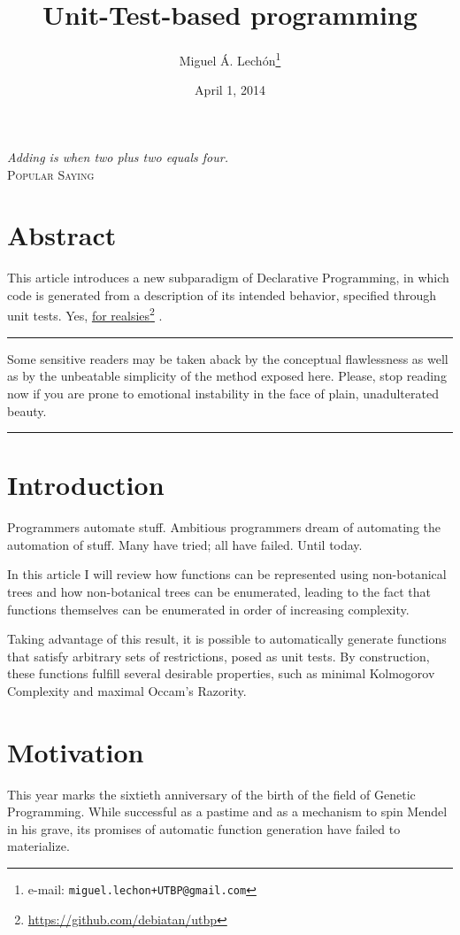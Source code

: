 \documentclass[12pt,twocolumn]{article}
\title{Unit-Test-based programming}
\author{
    Miguel Á. Lechón\footnote{{\small e-mail: \texttt{miguel.lechon+UTBP@gmail.com}}}
}
\date{April 1, 2014}
\newcommand\fnurl[2]{%
  \href{#1}{#2}\footnote{\url{#1}}%
}
\begin{document}
\maketitle
\thispagestyle{empty}
\pagestyle{empty}

\textit{Adding is when two plus two equals four.}\\\hspace*{0em}\hfill\textsc{Popular Saying}


\section*{Abstract}
This article introduces a new subparadigm of Declarative Programming, in which code is generated from a description of its intended behavior, specified through unit tests. Yes, \fnurl{https://github.com/debiatan/utbp}{for realsies}.\\

\hrule Some sensitive readers may be taken aback by the conceptual flawlessness as well as by the unbeatable simplicity of the method exposed here. Please, {\color{red}stop reading now if you are prone to emotional instability in the face of plain, unadulterated beauty}.\hrule

\section{Introduction}
Programmers automate stuff. Ambitious programmers dream of automating the automation of stuff. Many have tried; all have failed. Until today.

In this article I will review how functions can be represented using non-botanical trees\cite{McCarthy1960} and how non-botanical trees can be enumerated\cite{EricLippert2010}, leading to the fact that functions themselves can be enumerated in order of increasing complexity. 

Taking advantage of this result, it is possible to automatically generate functions that satisfy arbitrary sets of restrictions, posed as unit tests. By construction, these functions fulfill several desirable properties, such as minimal Kolmogorov Complexity and maximal Occam's Razority.

\section{Motivation}
This year marks the sixtieth anniversary of the birth of the field of Genetic Programming. While successful as a pastime and as a mechanism to spin Mendel in his grave, its promises of automatic function generation have failed to materialize. 
\end{document}
